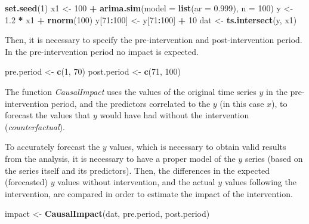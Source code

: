 \documentclass[
]{article}
\newenvironment{Shaded}{\begin{snugshade}}{\end{snugshade}}
\newcommand{\DataTypeTok}[1]{\textcolor[rgb]{0.13,0.29,0.53}{#1}}
\newcommand{\DecValTok}[1]{\textcolor[rgb]{0.00,0.00,0.81}{#1}}
\newcommand{\FloatTok}[1]{\textcolor[rgb]{0.00,0.00,0.81}{#1}}
\newcommand{\KeywordTok}[1]{\textcolor[rgb]{0.13,0.29,0.53}{\textbf{#1}}}
\newcommand{\NormalTok}[1]{#1}
\newcommand{\OperatorTok}[1]{\textcolor[rgb]{0.81,0.36,0.00}{\textbf{#1}}}
\newcommand{\StringTok}[1]{\textcolor[rgb]{0.31,0.60,0.02}{#1}}
\begin{document}
\begin{Shaded}
\begin{Highlighting}[]
\KeywordTok{set.seed}\NormalTok{(}\DecValTok{1}\NormalTok{)}
\NormalTok{x1 <-}\StringTok{ }\DecValTok{100} \OperatorTok{+}\StringTok{ }\KeywordTok{arima.sim}\NormalTok{(}\DataTypeTok{model =} \KeywordTok{list}\NormalTok{(}\DataTypeTok{ar =} \FloatTok{0.999}\NormalTok{), }\DataTypeTok{n =} \DecValTok{100}\NormalTok{)}
\NormalTok{y <-}\StringTok{ }\FloatTok{1.2} \OperatorTok{*}\StringTok{ }\NormalTok{x1 }\OperatorTok{+}\StringTok{ }\KeywordTok{rnorm}\NormalTok{(}\DecValTok{100}\NormalTok{)}
\NormalTok{y[}\DecValTok{71}\OperatorTok{:}\DecValTok{100}\NormalTok{] <-}\StringTok{ }\NormalTok{y[}\DecValTok{71}\OperatorTok{:}\DecValTok{100}\NormalTok{] }\OperatorTok{+}\StringTok{ }\DecValTok{10}
\NormalTok{dat <-}\StringTok{ }\KeywordTok{ts.intersect}\NormalTok{(y, x1)}
\end{Highlighting}
\end{Shaded}

Then, it is necessary to specify the pre-intervention and post-intervention period. In the pre-intervention period no impact is expected.

\begin{Shaded}
\begin{Highlighting}[]
\NormalTok{pre.period <-}\StringTok{ }\KeywordTok{c}\NormalTok{(}\DecValTok{1}\NormalTok{, }\DecValTok{70}\NormalTok{)}
\NormalTok{post.period <-}\StringTok{ }\KeywordTok{c}\NormalTok{(}\DecValTok{71}\NormalTok{, }\DecValTok{100}\NormalTok{)}
\end{Highlighting}
\end{Shaded}

The function \emph{CausalImpact} uses the values of the original time series \(y\) in the pre-intervention period, and the predictors correlated to the \(y\) (in this case \(x\)), to forecast the values that \(y\) would have had without the intervention (\emph{counterfactual}).

To accurately forecast the \(y\) values, which is necessary to obtain valid results from the analysis, it is necessary to have a proper model of the \(y\) series (based on the series itself and its predictors). Then, the differences in the expected (forecasted) \(y\) values without intervention, and the actual \(y\) values following the intervention, are compared in order to estimate the impact of the intervention.

\begin{Shaded}
\begin{Highlighting}[]
\NormalTok{impact <-}\StringTok{ }\KeywordTok{CausalImpact}\NormalTok{(dat, pre.period, post.period)}
\end{Highlighting}
\end{Shaded}
\end{document}
